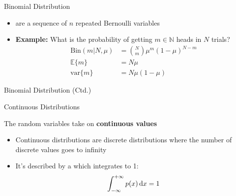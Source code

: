 \begin{frame}{Binomial Distribution}{}
	\begin{itemize}
		\item {} are a sequence of $n$ repeated Bernoulli variables
		\item \textbf{Example:} What is the probability of getting $m \in \mathbb{N}$ heads in $N$ trials?
		\begin{align}
			\text{Bin}(m \vert N, \mu)
				&= \binom{N}{m} \mu^m (1 - \mu)^{N - m}		\\[2mm]
			\mathbb{E}\{ m \}
				&= N \mu 								\\[2mm]
			\text{var}\{ m \}
				&= N \mu (1 - \mu)
		\end{align}
	\end{itemize}
\end{frame}


\begin{frame}{Binomial Distribution (Ctd.)}{}
	
\end{frame}


\begin{frame}{Continuous Distributions}{}
	\begin{boxBlueNoFrame}
		The random variables take on \textbf{continuous values}
	\end{boxBlueNoFrame}

	\begin{itemize}
		\item Continuous distributions are discrete distributions where the number of discrete values goes to infinity
		\item It's described by a  which integrates to 1:
		\begin{equation*}
			\int_{-\infty}^{+\infty} p(x) \mathop{}\!\mathrm{d} x = 1
		\end{equation*}
	\end{itemize}
\end{frame}


